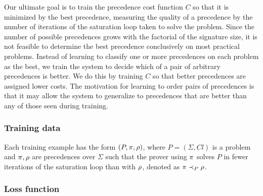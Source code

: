 Our ultimate goal is to train the precedence cost function $C$ so that it is minimized by the best precedence,
measuring the quality of a precedence by the number of iterations of the saturation loop taken to solve the problem.
Since the number of possible precedences grows with the factorial of the signature size,
it is not feasible to determine the best precedence conclusively on most practical problems.
Instead of learning to classify one or more precedences on each problem as the best,
we train the system to decide which of a pair of arbitrary precedences is better.
We do this by training $C$ so that better precedences are assigned lower costs.
The motivation for learning to order pairs of precedences
is that it may allow the system to generalize to precedences that are better than any of those seen during training.

\subsubsection{Training data}

Each training example has the form $(P, \pi, \rho)$,
where $P = (\Sigma, \mathit{Cl})$ is a problem
and $\pi, \rho$ are precedences over $\Sigma$
such that the prover using $\pi$ solves $P$ in fewer iterations of the saturation loop than with $\rho$,
denoted as $\pi \prec_{P} \rho$.

\subsubsection{Loss function}

